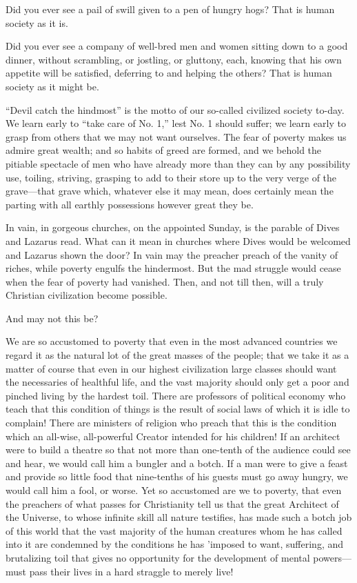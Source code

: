 \documentclass{book}
\begin{document}
Did you ever see a pail of swill given to a pen of hungry hogs? That is human society as it is.

Did you ever see a company of well-bred men and women sitting down to a good dinner, without scrambling, or jostling, or gluttony, each, knowing that his own appetite will be satisfied, deferring to and helping the others? That is human society as it might be.

“Devil catch the hindmost” is the motto of our so-called civilized society to-day. We learn early to “take care of No. 1,” lest No. 1 should suffer; we learn early to grasp from others that we may not want ourselves. The fear of poverty makes us admire great wealth; and so habits of greed are formed, and we behold the pitiable spectacle of men who have already more than they can by any possibility use, toiling, striving, grasping to add to their store up to the very verge of the grave—that grave which, whatever else it may mean, does certainly mean the parting with all earthly possessions however great they be.

In vain, in gorgeous churches, on the appointed Sunday, is the parable of Dives and Lazarus read. What can it mean in churches where Dives would be welcomed and Lazarus shown the door? In vain may the preacher preach of the vanity of riches, while poverty engulfs the hindermost. But the mad struggle would cease when the fear of poverty had vanished. Then, and not till then, will a truly Christian civilization become possible.

And may not this be?

We are so accustomed to poverty that even in the most advanced countries we regard it as the natural lot of the great masses of the people; that we take it as a matter of course that even in our highest civilization large classes should want the necessaries of healthful life, and the vast majority should only get a poor and pinched living by the hardest toil. There are professors of political economy who teach that this condition of things is the result of social laws of which it is idle to complain! There are ministers of religion who preach that this is the condition which an all-wise, all-powerful Creator intended for his children! If an architect were to build a theatre so that not more than one-tenth of the audience could see and hear, we would call him a bungler and a botch. If a man were to give a feast and provide so little food that nine-tenths of his guests must go away hungry, we would call him a fool, or worse. Yet so accustomed are we to poverty, that even the preachers of what passes for Christianity tell us that the great Architect of the Universe, to whose infinite skill all nature testifies, has made such a botch job of this world that the vast majority of the human creatures whom he has called into it are condemned by the conditions he has ’imposed to want, suffering, and brutalizing toil that gives no opportunity for the development of mental powers—must pass their lives in a hard straggle to merely live!
\end{document}
